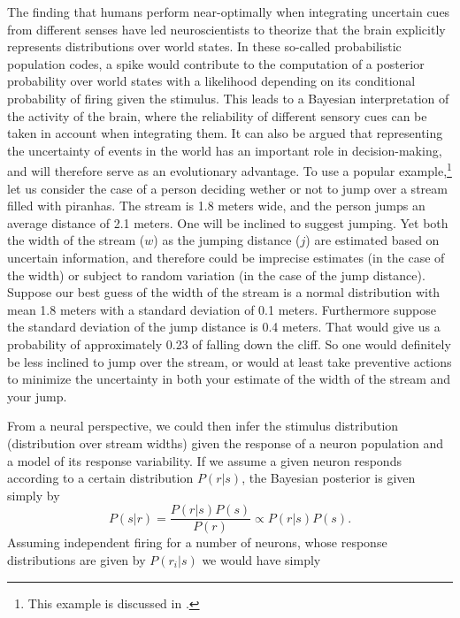 The finding that humans perform near-optimally when integrating uncertain cues from different senses have led neuroscientists to theorize that the brain explicitly represents distributions over world states.\cite{Ernst2002,Ma2006} In these so-called probabilistic population codes, a spike would contribute to the computation of a posterior probability over world states with a likelihood depending on its conditional probability of firing given the stimulus. This leads to a Bayesian interpretation of the activity of the brain, where the reliability of different sensory cues can be taken in account when integrating them. It can also be argued that representing the uncertainty of events in the world has an important role in decision-making, and will therefore serve as an evolutionary advantage. To use a popular example,\footnote{This example is discussed in \citep{Ma2006}.} let us consider the case of a person deciding wether or not to jump over a stream filled with piranhas. The stream is 1.8 meters wide, and the person jumps an average distance of 2.1 meters. One will be inclined to suggest jumping. Yet both the width of the stream ($w$) as the jumping distance ($j$) are estimated based on uncertain information, and therefore could be imprecise estimates (in the case of the width) or subject to random variation (in the case of the jump distance). Suppose our best guess of the width of the stream is a normal distribution with mean 1.8 meters with a standard deviation of 0.1 meters. Furthermore suppose the standard deviation of the jump distance is 0.4 meters. That would give us a probability of approximately 0.23 of falling down the cliff. So one would definitely be less inclined to jump over the stream, or would at least take preventive actions to minimize the uncertainty in both your estimate of the width of the stream and your jump.\par
From a neural perspective, we could then infer the stimulus distribution (distribution over stream widths) given the response of a neuron population and a model of its response variability. If we assume a given neuron responds according to a certain distribution $P(r|s)$, the Bayesian posterior is given simply by
\[
P(s|r) = \frac{P(r|s) P(s)}{P(r)} \propto P(r|s) P(s).
\]
Assuming independent firing for a number of neurons, whose response distributions are given by $P(r_i|s)$ we would have simply
